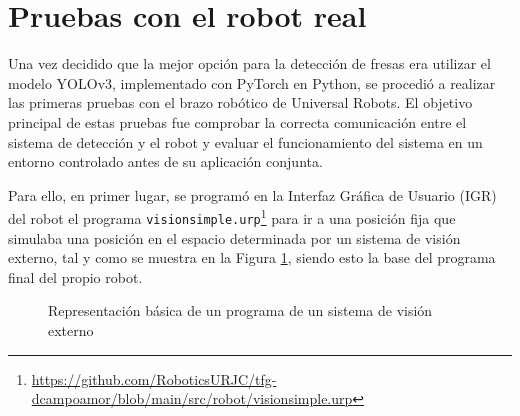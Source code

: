 \section{Pruebas con el robot real}
\label{Pruebas_UR}

Una vez decidido que la mejor opción para la detección de fresas era utilizar el modelo YOLOv3, implementado con PyTorch en Python, se procedió a realizar las primeras pruebas con el brazo robótico de Universal Robots. El objetivo principal de estas pruebas fue comprobar la correcta comunicación entre el sistema de detección y el robot y evaluar el funcionamiento del sistema en un entorno controlado antes de su aplicación conjunta.

Para ello, en primer lugar, se programó en la Interfaz Gráfica de Usuario (IGR) del robot el programa \verb|visionsimple.urp|\footnote{\url{https://github.com/RoboticsURJC/tfg-dcampoamor/blob/main/src/robot/visionsimple.urp}} para ir a una posición fija que simulaba una posición en el espacio determinada por un sistema de visión externo, tal y como se muestra en la Figura \ref{fig:visionsimple}, siendo esto la base del programa final del propio robot.

   \begin{figure}[H]
      \begin{center}
        \subcapcentertrue
        \hspace{1mm}
      \end{center}
      \caption{Representación básica de un programa de un sistema de visión externo}
      \label{fig:visionsimple}
    \end{figure}

